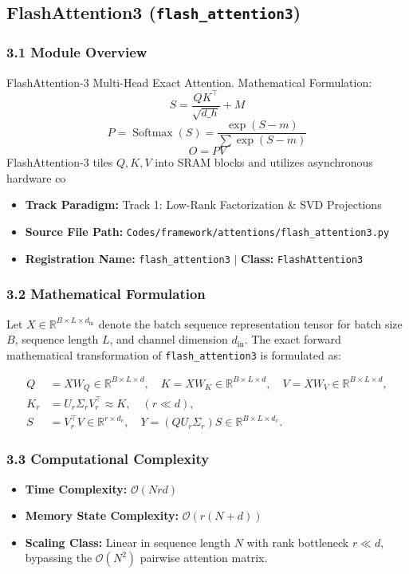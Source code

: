 \subsection{FlashAttention3 (\texttt{flash\_attention3})}
\label{sec:app_module_flash\_attention3}

\subsubsection*{3.1 Module Overview}
FlashAttention-3 Multi-Head Exact Attention.  Mathematical Formulation:     $$S = \frac{Q K^\top}{\sqrt{d\_h}} + M$$     $$P = \operatorname{Softmax}(S) = \frac{\exp(S - m)}{\sum \exp(S - m)}$$     $$O = P V$$     FlashAttention-3 tiles $Q, K, V$ into SRAM blocks and utilizes asynchronous hardware co
\begin{itemize}
    \item \textbf{Track Paradigm:} Track 1: Low-Rank Factorization & SVD Projections
    \item \textbf{Source File Path:} \texttt{Codes/framework/attentions/flash\_attention3.py}
    \item \textbf{Registration Name:} \texttt{flash\_attention3} $\mid$ \textbf{Class:} \texttt{FlashAttention3}
\end{itemize}

\subsubsection*{3.2 Mathematical Formulation}
Let $X \in \mathbb{R}^{B \times L \times d_{\text{in}}}$ denote the batch sequence representation tensor for batch size $B$, sequence length $L$, and channel dimension $d_{\text{in}}$. The exact forward mathematical transformation of \texttt{flash\_attention3} is formulated as:

\begin{align}
Q &= X W_Q \in \mathbb{R}^{B \times L \times d}, \quad K = X W_K \in \mathbb{R}^{B \times L \times d}, \quad V = X W_V \in \mathbb{R}^{B \times L \times d}, \\
K_r &= U_r \Sigma_r V_r^\top \approx K, \quad (r \ll d), \\
S &= V_r^\top V \in \mathbb{R}^{r \times d_v}, \quad Y = (Q U_r \Sigma_r) S \in \mathbb{R}^{B \times L \times d_v}.
\end{align}


\subsubsection*{3.3 Computational Complexity}
\begin{itemize}
    \item \textbf{Time Complexity:} $\mathcal{O}(N r d)$
    \item \textbf{Memory State Complexity:} $\mathcal{O}(r(N + d))$
    \item \textbf{Scaling Class:} Linear in sequence length $N$ with rank bottleneck $r \ll d$, bypassing the $\mathcal{O}(N^2)$ pairwise attention matrix.
\end{itemize}

